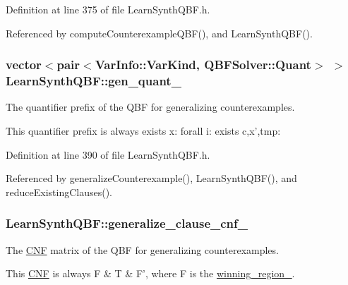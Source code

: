 Definition at line 375 of file Learn\-Synth\-Q\-B\-F.\-h.



Referenced by compute\-Counterexample\-Q\-B\-F(), and Learn\-Synth\-Q\-B\-F().

\hypertarget{classLearnSynthQBF_a2a6687cca6f45b9684d3bd6e7cc8c20c}{
\subsubsection[{gen\-\_\-quant\-\_\-}]{\setlength{\rightskip}{0pt plus 5cm}vector$<$pair$<${\bf Var\-Info\-::\-Var\-Kind}, {\bf Q\-B\-F\-Solver\-::\-Quant}$>$ $>$ Learn\-Synth\-Q\-B\-F\-::gen\-\_\-quant\-\_\-\hspace{0.3cm}{\ttfamily [protected]}}}\label{classLearnSynthQBF_a2a6687cca6f45b9684d3bd6e7cc8c20c}


The quantifier prefix of the Q\-B\-F for generalizing counterexamples. 

This quantifier prefix is always exists x\-: forall i\-: exists c,x',tmp\-: 

Definition at line 390 of file Learn\-Synth\-Q\-B\-F.\-h.



Referenced by generalize\-Counterexample(), Learn\-Synth\-Q\-B\-F(), and reduce\-Existing\-Clauses().

\hypertarget{classLearnSynthQBF_adb0678a7c034958c31bd5d92615e9859}{
\subsubsection[{generalize\-\_\-clause\-\_\-cnf\-\_\-}]{ Learn\-Synth\-Q\-B\-F\-::generalize\-\_\-clause\-\_\-cnf\-\_\-\hspace{0.3cm}{\ttfamily [protected]}}}\label{classLearnSynthQBF_adb0678a7c034958c31bd5d92615e9859}


The \hyperlink{classCNF}{C\-N\-F} matrix of the Q\-B\-F for generalizing counterexamples. 

This \hyperlink{classCNF}{C\-N\-F} is always F \& T \& F', where F is the \hyperlink{classLearnSynthQBF_a9c6b41f7df5f4ed4bfc5930136fc1152}{winning\-\_\-region\-\_\-}. 

